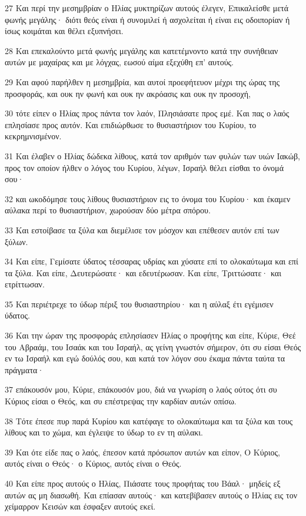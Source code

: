 \par 27 Και περί την μεσημβρίαν ο Ηλίας μυκτηρίζων αυτούς έλεγεν, Επικαλείσθε μετά φωνής μεγάλης· διότι θεός είναι ή συνομιλεί ή ασχολείται ή είναι εις οδοιπορίαν ή ίσως κοιμάται και θέλει εξυπνήσει.
\par 28 Και επεκαλούντο μετά φωνής μεγάλης και κατετέμνοντο κατά την συνήθειαν αυτών με μαχαίρας και με λόγχας, εωσού αίμα εξεχύθη επ' αυτούς.
\par 29 Και αφού παρήλθεν η μεσημβρία, και αυτοί προεφήτευον μέχρι της ώρας της προσφοράς, και ουκ ην φωνή και ουκ ην ακρόασις και ουκ ην προσοχή,
\par 30 τότε είπεν ο Ηλίας προς πάντα τον λαόν, Πλησιάσατε προς εμέ. Και πας ο λαός επλησίασε προς αυτόν. Και επιδιώρθωσε το θυσιαστήριον του Κυρίου, το κεκρημνισμένον.
\par 31 Και έλαβεν ο Ηλίας δώδεκα λίθους, κατά τον αριθμόν των φυλών των υιών Ιακώβ, προς τον οποίον ήλθεν ο λόγος του Κυρίου, λέγων, Ισραήλ θέλει είσθαι το όνομά σου·
\par 32 και ωκοδόμησε τους λίθους θυσιαστήριον εις το όνομα του Κυρίου· και έκαμεν αύλακα περί το θυσιαστήριον, χωρούσαν δύο μέτρα σπόρου.
\par 33 Και εστοίβασε τα ξύλα και διεμέλισε τον μόσχον και επέθεσεν αυτόν επί των ξύλων.
\par 34 Και είπε, Γεμίσατε ύδατος τέσσαρας υδρίας και χύσατε επί το ολοκαύτωμα και επί τα ξύλα. Και είπε, Δευτερώσατε· και εδευτέρωσαν. Και είπε, Τριττώσατε· και ετρίττωσαν.
\par 35 Και περιέτρεχε το ύδωρ πέριξ του θυσιαστηρίου· και η αύλαξ έτι εγέμισεν ύδατος.
\par 36 Και την ώραν της προσφοράς επλησίασεν Ηλίας ο προφήτης και είπε, Κύριε, Θεέ του Αβραάμ, του Ισαάκ και του Ισραήλ, ας γείνη γνωστόν σήμερον, ότι συ είσαι Θεός εν τω Ισραήλ και εγώ δούλός σου, και κατά τον λόγον σου έκαμα πάντα ταύτα τα πράγματα·
\par 37 επάκουσόν μου, Κύριε, επάκουσόν μου, διά να γνωρίση ο λαός ούτος ότι συ Κύριος είσαι ο Θεός, και συ επέστρεψας την καρδίαν αυτών οπίσω.
\par 38 Τότε έπεσε πυρ παρά Κυρίου και κατέφαγε το ολοκαύτωμα και τα ξύλα και τους λίθους και το χώμα, και έγλειψε το ύδωρ το εν τη αύλακι.
\par 39 Και ότε είδε πας ο λαός, έπεσον κατά πρόσωπον αυτών και είπον, Ο Κύριος, αυτός είναι ο Θεός· ο Κύριος, αυτός είναι ο Θεός.
\par 40 Και είπε προς αυτούς ο Ηλίας, Πιάσατε τους προφήτας του Βάαλ· μηδείς εξ αυτών ας μη διασωθή. Και επίασαν αυτούς· και κατεβίβασεν αυτούς ο Ηλίας εις τον χείμαρρον Κεισών και έσφαξεν αυτούς εκεί.

